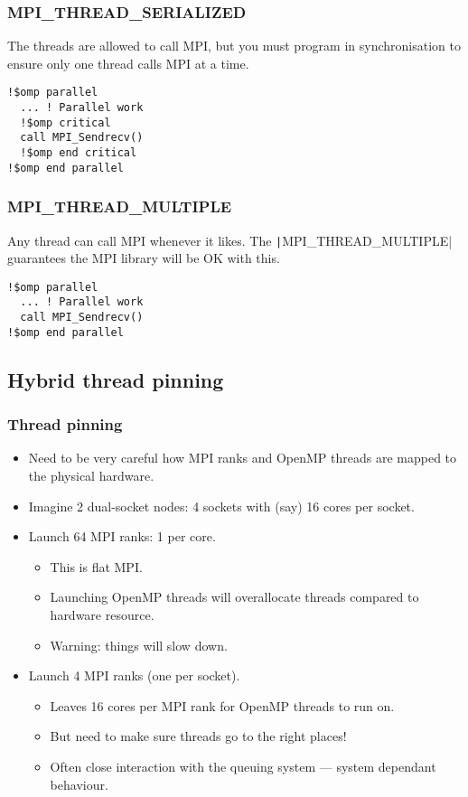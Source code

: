 \documentclass{beamer}
\begin{document}
\begin{frame}[fragile]
\frametitle{MPI\_THREAD\_SERIALIZED}
The threads are allowed to call MPI, but you must program in synchronisation to ensure only one thread calls MPI at a time.
\begin{verbatim}
!$omp parallel
  ... ! Parallel work
  !$omp critical
  call MPI_Sendrecv()
  !$omp end critical
!$omp end parallel
\end{verbatim}
\end{frame}

\begin{frame}[fragile]
\frametitle{MPI\_THREAD\_MULTIPLE}
Any thread can call MPI whenever it likes. The \texttt|MPI_THREAD_MULTIPLE| guarantees the MPI library will be OK with this.
\begin{verbatim}
!$omp parallel
  ... ! Parallel work
  call MPI_Sendrecv()
!$omp end parallel
\end{verbatim}
\end{frame}

\subsection{Hybrid thread pinning}
\begin{frame}
\frametitle{Thread pinning}
\begin{itemize}
  \item Need to be very careful how MPI ranks and OpenMP threads are mapped to the physical hardware.
  \item Imagine 2 dual-socket nodes: 4 sockets with (say) 16 cores per socket.
  \item Launch 64 MPI ranks: 1 per core.
    \begin{itemize}
      \item This is flat MPI.
      \item Launching OpenMP threads will overallocate threads compared to hardware resource.
      \item Warning: things will slow down.
    \end{itemize}
  \item Launch 4 MPI ranks (one per socket).
    \begin{itemize}
      \item Leaves 16 cores per MPI rank for OpenMP threads to run on.
      \item But need to make sure threads go to the right places!
      \item Often close interaction with the queuing system --- system dependant behaviour.
    \end{itemize}
\end{itemize}
\end{frame}
\end{document}
